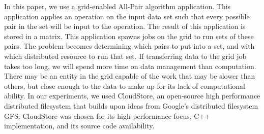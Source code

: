 \documentclass[a4paper,11pt]{article}
\newcommand{\jhanote}[1]{ {\textcolor{red} { ***Jha: #1 }}}
\newcommand{\jhanote}[1]{}
\begin{document}
%
%

In this paper, we use a grid-enabled All-Pair algorithm application.  This application applies an operation on the input data set such that every possible pair in the set will be input to the operation.  The result of this application is stored in a matrix.  This application spawns jobs on the grid to run sets of these pairs.  The problem becomes determining which pairs to put into a set, and with which distributed resource to run that set.  If transferring data to the grid job takes too long, we will spend more time on data management than computation.  There may be an entity in the grid capable of the work that may be slower than others, but close enough to the data to make up for its lack of computational ability. In our experiments, we used CloudStore, an open-source high performance distributed filesystem that builds upon ideas from Google's distributed filesystem GFS.  CloudStore was chosen for its high performance focus, C++ implementation, and its source code availability.
\end{document}

